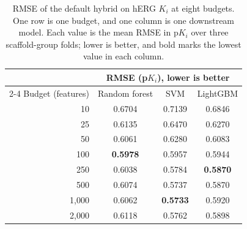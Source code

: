 \begin{table}[htbp]
\centering
\small
\begin{tabular}{@{}rccc@{}}
\toprule
 & \multicolumn{3}{c}{RMSE (p$K_i$), lower is better} \\
\cmidrule(l){2-4}
Budget (features) & Random forest & SVM & LightGBM \\
\midrule
10 & 0.6704 & 0.7139 & 0.6846 \\
25 & 0.6135 & 0.6470 & 0.6270 \\
50 & 0.6061 & 0.6280 & 0.6083 \\
100 & \textbf{0.5978} & 0.5957 & 0.5944 \\
250 & 0.6038 & 0.5784 & \textbf{0.5870} \\
500 & 0.6074 & 0.5737 & 0.5870 \\
1,000 & 0.6062 & \textbf{0.5733} & 0.5920 \\
2,000 & 0.6118 & 0.5762 & 0.5898 \\
\bottomrule
\end{tabular}
\caption[RMSE of the default hybrid against budget on hERG $K_i$.]{RMSE of the default hybrid on hERG $K_i$ at eight budgets. One row is one budget, and one column is one downstream model. Each value is the mean RMSE in p$K_i$ over three scaffold-group folds; lower is better, and bold marks the lowest value in each column.}
\label{tab:prelim_budget}
\end{table}


